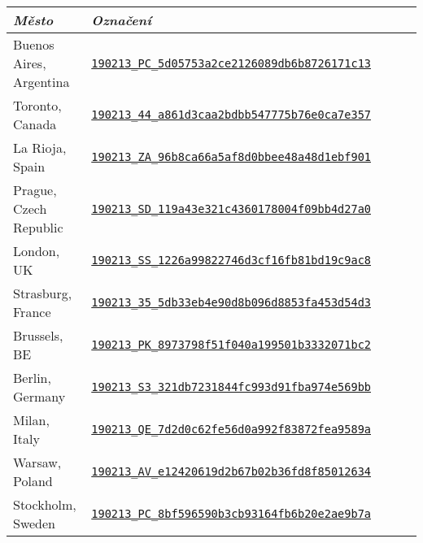 \documentclass[a4paper, 12pt]{article}
\begin{document}
\begin{table}[H]
  \centering
  \begin{tabular}{*5l}  \toprule
    \emph{Město}            & \emph{Označení}                      \\ \midrule
    Buenos Aires, Argentina & \href{https://www.webpagetest.org/result/190213_PC_5d05753a2ce2126089db6b8726171c13}{\texttt{190213\_PC\_5d05753a2ce2126089db6b8726171c13}} \\
    Toronto, Canada         & \href{https://www.webpagetest.org/result/190213_44_a861d3caa2bdbb547775b76e0ca7e357}{\texttt{190213\_44\_a861d3caa2bdbb547775b76e0ca7e357}} \\
    La Rioja, Spain         & \href{https://www.webpagetest.org/result/190213_ZA_96b8ca66a5af8d0bbee48a48d1ebf901}{\texttt{190213\_ZA\_96b8ca66a5af8d0bbee48a48d1ebf901}} \\
    Prague, Czech Republic  & \href{https://www.webpagetest.org/result/190213_SD_119a43e321c4360178004f09bb4d27a0}{\texttt{190213\_SD\_119a43e321c4360178004f09bb4d27a0}} \\
    London, UK              & \href{https://www.webpagetest.org/result/190213_SS_1226a99822746d3cf16fb81bd19c9ac8}{\texttt{190213\_SS\_1226a99822746d3cf16fb81bd19c9ac8}} \\
    Strasburg, France       & \href{https://www.webpagetest.org/result/190213_35_5db33eb4e90d8b096d8853fa453d54d3}{\texttt{190213\_35\_5db33eb4e90d8b096d8853fa453d54d3}} \\
    Brussels, BE            & \href{https://www.webpagetest.org/result/190213_PK_8973798f51f040a199501b3332071bc2}{\texttt{190213\_PK\_8973798f51f040a199501b3332071bc2}} \\
    Berlin, Germany         & \href{https://www.webpagetest.org/result/190213_S3_321db7231844fc993d91fba974e569bb}{\texttt{190213\_S3\_321db7231844fc993d91fba974e569bb}} \\
    Milan, Italy            & \href{https://www.webpagetest.org/result/190213_QE_7d2d0c62fe56d0a992f83872fea9589a}{\texttt{190213\_QE\_7d2d0c62fe56d0a992f83872fea9589a}} \\
    Warsaw, Poland          & \href{https://www.webpagetest.org/result/190213_AV_e12420619d2b67b02b36fd8f85012634}{\texttt{190213\_AV\_e12420619d2b67b02b36fd8f85012634}} \\
    Stockholm, Sweden       & \href{https://www.webpagetest.org/result/190213_PC_8bf596590b3cb93164fb6b20e2ae9b7a}{\texttt{190213\_PC\_8bf596590b3cb93164fb6b20e2ae9b7a}} \\

\end{tabular}
\end{table}
\end{document}
